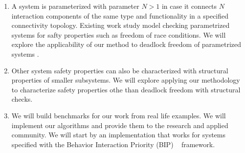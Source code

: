 \begin{enumerate}
		
\item 
A system is parameterized with parameter $N>1$ 
in case it connects $N$ interaction components of the 
same type and functionality in a specified connectivity topology. 
Existing work study model checking parametrized systems for safty properties
such as freedom of race conditions. 
We will explore the applicability of our method to deadlock freedom 
of parametrized systems
		. 

\item
Other system safety properties can also be characterized with structural 
properties of smaller subsystems. 
We will explore applying our methodology to characterize safety properties 
othe than deadlock freedom with structural checks. 

\item 
We will build benchmarks for our work from real life examples.
We will implement our algorithms and provide them to the research and 
applied community. 
We will start by an implementation that works for systems specified with 
the Behavior Interaction Priority (BIP) ~\cite{bip06} framework.

\end{enumerate}


